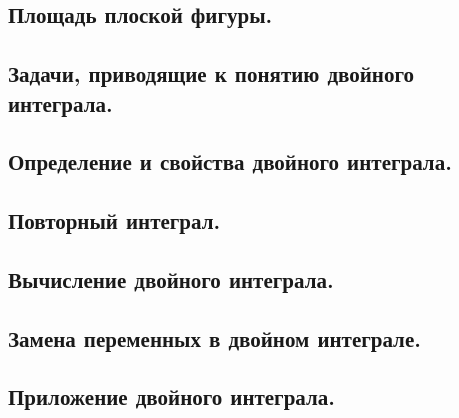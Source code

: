 \subsection{Площадь плоской фигуры.} 



\newpage
\subsection{Задачи, приводящие к понятию двойного интеграла.}



\newpage
\subsection{Определение и свойства двойного интеграла.}



\newpage
\subsection{Повторный интеграл.}



\newpage
\subsection{Вычисление двойного интеграла.}



\newpage
\subsection{Замена переменных в двойном интеграле.}



\newpage
\subsection{Приложение двойного интеграла.}




